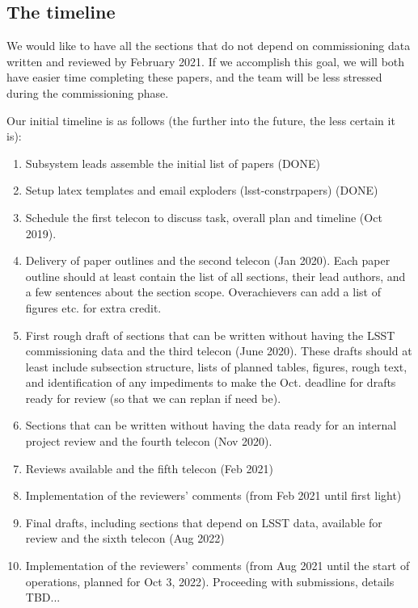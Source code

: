 \subsection{The timeline} 

We would like to have all the sections that do not depend on commissioning data 
written and reviewed by February 2021. If we accomplish this goal, we will both
have easier time completing these papers, and the team will be less stressed during
the commissioning phase. 

Our initial timeline is as follows (the further into the future, the less certain it is): 
\begin{enumerate} 
\item 
Subsystem leads assemble the initial list of papers (DONE)
\item
Setup latex templates and email exploders (lsst-constrpapers) (DONE)
\item
Schedule the first telecon to discuss task, overall plan and timeline (Oct 2019).
\item 
Delivery of paper outlines and the second telecon (Jan 2020). Each paper
outline should at least contain the list of all sections, their lead authors, and
a few sentences about the section scope. Overachievers can add a list of figures etc.
for extra credit. 
\item
First rough draft of sections that can be written without having the LSST commissioning
data and the third telecon (June 2020). These drafts should at least include subsection
structure, lists of planned tables, figures, rough text,  and identification of any impediments 
to make the Oct. deadline for drafts ready for review (so that we can replan if need be). 
\item 
Sections that can be written without having the data ready for an internal project review and
the fourth telecon (Nov 2020). 
\item
Reviews available and the fifth telecon (Feb 2021)
\item
Implementation of the reviewers' comments (from Feb 2021 until first light) 
\item 
Final drafts, including sections that depend on LSST data, available for
review and the sixth telecon (Aug 2022)
\item
Implementation of the reviewers' comments (from Aug 2021 until the start of operations, 
planned for Oct 3, 2022).  Proceeding with submissions, details TBD...
\end{enumerate}




